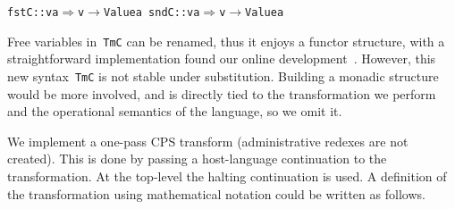 \documentclass[9pt,authoryear]{sigplanconf}
\begin{document}
{{}\vphantom{$\{$}}\texttt{fstC}\texttt{\mbox{\hspace{0.50em}}}\texttt{{:}{:}}\texttt{\mbox{\hspace{0.50em}}}\texttt{\makebox[1.22ex][l]{$ {(} $}}\texttt{v}\texttt{\mbox{\hspace{0.50em}}}\texttt{\makebox[1.22ex][c]{$ \in $}}\texttt{\mbox{\hspace{0.50em}}}\texttt{a}\texttt{\makebox[1.22ex][r]{$ {)} $}}\texttt{\mbox{\hspace{0.50em}}}\texttt{$ \Rightarrow $}\texttt{\mbox{\hspace{0.50em}}}\texttt{v}\texttt{\mbox{\hspace{0.50em}}}\texttt{$ \rightarrow $}\texttt{\mbox{\hspace{0.50em}}}\texttt{Value}\texttt{\mbox{\hspace{0.50em}}}\texttt{a}\texttt{{\nopagebreak \newline%
}\vphantom{$\{$}}\texttt{sndC}\texttt{\mbox{\hspace{0.50em}}}\texttt{{:}{:}}\texttt{\mbox{\hspace{0.50em}}}\texttt{\makebox[1.22ex][l]{$ {(} $}}\texttt{v}\texttt{\mbox{\hspace{0.50em}}}\texttt{\makebox[1.22ex][c]{$ \in $}}\texttt{\mbox{\hspace{0.50em}}}\texttt{a}\texttt{\makebox[1.22ex][r]{$ {)} $}}\texttt{\mbox{\hspace{0.50em}}}\texttt{$ \Rightarrow $}\texttt{\mbox{\hspace{0.50em}}}\texttt{v}\texttt{\mbox{\hspace{0.50em}}}\texttt{$ \rightarrow $}\texttt{\mbox{\hspace{0.50em}}}\texttt{Value}\texttt{\mbox{\hspace{0.50em}}}\texttt{a}\texttt{{\nopagebreak \newline%
}\vphantom{$\{$}}%


%
Free variables in{~}\texttt{TmC} can be renamed, thus it enjoys a
    functor structure, with a straightforward implementation found
    our online development{~}\cite{namesforfreerepo}. However, this
    new syntax{~}\texttt{TmC} is not stable under substitution. Building a
    monadic structure would be more involved, and is directly tied to
    the transformation we perform and the operational semantics of the
    language, so we omit it.%


%
We implement a one-pass CPS transform (administrative redexes are
    not created). This is done by passing a host-language continuation
    to the transformation. At the top-level the halting continuation
    is used. A definition of the transformation using mathematical
    notation could be written as follows.%
\end{document}
